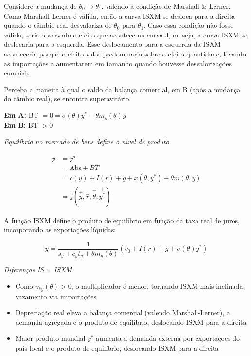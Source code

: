 \documentclass[a4paper,12pt]{article}[abntex2]
\begin{document}
Considere a mudança de $\theta_0 \rightarrow \theta_1$, valendo a condição de Marshall \& Lerner. Como Marshall Lerner é válida, então a curva ISXM se desloca para a direita quando o câmbio real desvaloriza de $\theta_0$ para $\theta_1$. Caso essa condição não fosse válida, seria observado o efeito que acontece na curva J, ou seja, a curva ISXM se deslocaria para a esquerda. Esse deslocamento para a esquerda da ISXM aconteceria porque o efeito valor predominaria sobre o efeito quantidade, levando as importações a aumentarem em tamanho quando houvesse desvalorizações cambiais.

Perceba a maneira à qual o saldo da balança comercial, em B (após a mudança do câmbio real), se encontra superavitário.

\begin{center}
\textbf{Em A:} BT $= 0 = \sigma(\theta)y^* - \theta m_y(\theta)y$ \\
\textbf{Em B:} BT $> 0$
\end{center}

\textit{Equilíbrio no mercado de bens define o nível de produto}

\begin{align*}
y &= y^d \\
  &= \text{Abs} + BT \\
  &= c(y) + I(r) + g + x(\theta, y^*) - \theta m(\theta, y) \\
  &= f\left(\overset{+}{y}, \overset{-}{r}, \overset{+}{\theta}, \overset{+}{y^*}\right)
\end{align*}

A função ISXM define o produto de equilíbrio em função da taxa real de juros, incorporando as exportações líquidas:

\[
y = \dfrac{1}{s_y + c_y t_y + \theta m_y(\theta)} \left( c_0 + I(r) + g + \sigma(\theta) y^* \right)
\]

\textit{Diferenças IS $\times$ ISXM}
\begin{itemize}
  \item Como $m_y(\theta) > 0$, o multiplicador é menor, tornando ISXM mais inclinada: vazamento via importações
  \item Depreciação real eleva a balança comercial (valendo Marshall-Lerner), a demanda agregada e o produto de equilíbrio, deslocando ISXM para a direita
  \item Maior produto mundial $y^*$ aumenta a demanda externa por exportações do país local e o produto de equilíbrio, deslocando ISXM para a direita
\end{itemize}
\end{document}
